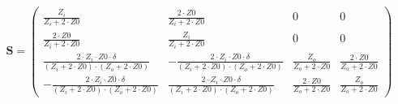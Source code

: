 \begin{equation} \mathbf{S} = \left(\begin{array}{cccc} \frac{Z_i}{Z_i+2\cdot Z0} & \frac{2\cdot Z0}{Z_i+2\cdot Z0} & 0 & 0 \\ \frac{2\cdot Z0}{Z_i+2\cdot Z0} & \frac{Z_i}{Z_i+2\cdot Z0} & 0 & 0 \\ \frac{2\cdot Z_i\cdot Z0\cdot \delta}{\left(Z_i+2\cdot Z0\right)\cdot\left(Z_o+2\cdot Z0\right)} & -\frac{2\cdot Z_i\cdot Z0\cdot \delta}{\left(Z_i+2\cdot Z0\right)\cdot\left(Z_o+2\cdot Z0\right)} & \frac{Z_o}{Z_o+2\cdot Z0} & \frac{2\cdot Z0}{Z_o+2\cdot Z0} \\ -\frac{2\cdot Z_i\cdot Z0\cdot \delta}{\left(Z_i+2\cdot Z0\right)\cdot\left(Z_o+2\cdot Z0\right)} & \frac{2\cdot Z_i\cdot Z0\cdot \delta}{\left(Z_i+2\cdot Z0\right)\cdot\left(Z_o+2\cdot Z0\right)} & \frac{2\cdot Z0}{Z_o+2\cdot Z0} & \frac{Z_o}{Z_o+2\cdot Z0} \end{array}\right) \end{equation}
